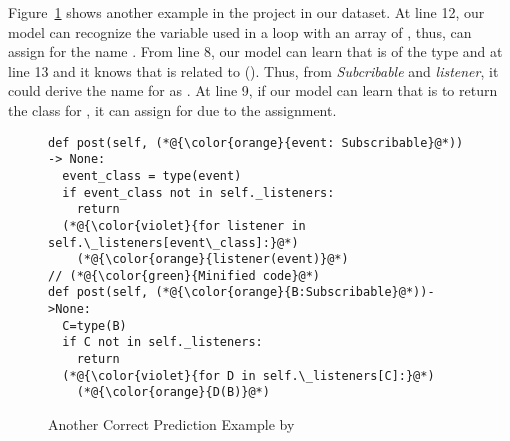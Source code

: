 Figure~\ref{example2} shows another example in the project
 in our dataset. At line 12, our model can recognize
the variable  used in a  loop with an array of
, thus, can assign for  the name
. From line 8, our model can learn that  is of
the type  and at line 13 and it knows that 
is related to  (). Thus, from {\em Subcribable}
and \emph{listener}, it could derive the name for  as
. At line 9, if our model can learn that  is to
return the class for , it can assign 
 for  due to the assignment.

\begin{figure}[t]
	\centering {} \begin{lstlisting}[]
def post(self, (*@{\color{orange}{event: Subscribable}@*)) -> None:
  event_class = type(event)
  if event_class not in self._listeners:
    return
  (*@{\color{violet}{for listener in self.\_listeners[event\_class]:}@*)
    (*@{\color{orange}{listener(event)}@*)
// (*@{\color{green}{Minified code}@*)
def post(self, (*@{\color{orange}{B:Subscribable}@*))->None:
  C=type(B)
  if C not in self._listeners:
    return
  (*@{\color{violet}{for D in self.\_listeners[C]:}@*)
    (*@{\color{orange}{D(B)}@*)
\end{lstlisting}
\vspace{-16pt}
\caption{Another Correct Prediction Example by {\tool}}
\label{example2}
\end{figure}
